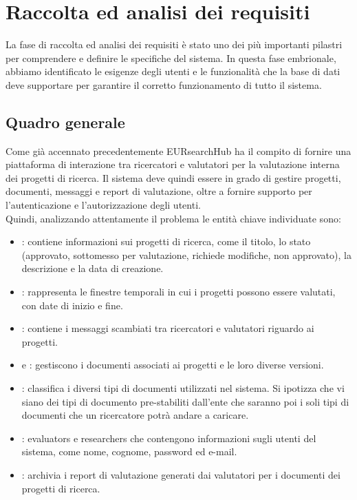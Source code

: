 \documentclass{report}
\begin{document}
\section{Raccolta ed analisi dei requisiti}
La fase di raccolta ed analisi dei requisiti è stato uno dei più importanti pilastri per comprendere e definire le specifiche del sistema. In questa fase embrionale, abbiamo identificato le esigenze degli utenti e le funzionalità che la base di dati deve supportare per garantire il corretto funzionamento di tutto il sistema. 
\subsection{Quadro generale}
Come già accennato precedentemente EURsearchHub ha il compito di fornire una piattaforma di interazione tra ricercatori e valutatori per la valutazione interna dei progetti di ricerca. Il sistema deve quindi essere in grado di gestire progetti, documenti, messaggi e report di valutazione, oltre a fornire supporto per l'autenticazione e l'autorizzazione degli utenti.\\
Quindi, analizzando attentamente il problema le entità chiave individuate sono:

\begin{itemize}
    \item {}: contiene informazioni sui progetti di ricerca, come il titolo, lo stato (approvato, sottomesso per valutazione, richiede modifiche, non approvato), la descrizione e la data di creazione.
    \item {}: rappresenta le finestre temporali in cui i progetti possono essere valutati, con date di inizio e fine.
        \item {}: contiene i messaggi scambiati tra ricercatori e valutatori riguardo ai progetti.
        
    \item {} e  : gestiscono i documenti associati ai progetti e le loro diverse versioni.

    \item {}: classifica i diversi tipi di documenti utilizzati nel sistema. Si ipotizza che vi siano dei tipi di documento pre-stabiliti dall'ente che saranno poi i soli tipi di documenti che un ricercatore potrà andare a caricare. 

    \item {}: evaluators e researchers che contengono informazioni sugli utenti del sistema, come nome, cognome, password ed e-mail.
    
    
    \item {}: archivia i report di valutazione generati dai valutatori per i documenti dei progetti di ricerca.


    \end{itemize}
\end{document}
